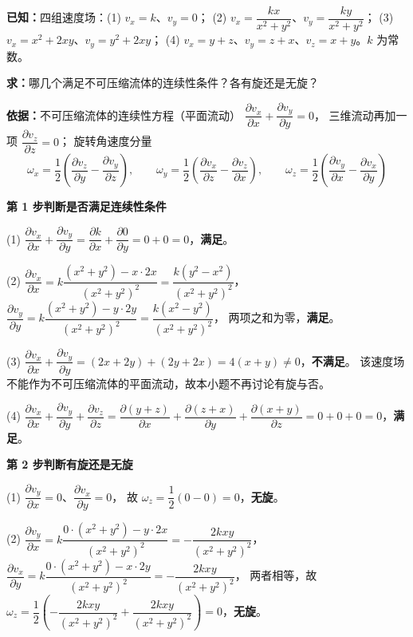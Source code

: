 \begin{jie}
\textbf{已知：}四组速度场：(1) $v_x=k$、$v_y=0$；
(2) $v_x=\dfrac{kx}{x^2+y^2}$、$v_y=\dfrac{ky}{x^2+y^2}$；
(3) $v_x=x^2+2xy$、$v_y=y^2+2xy$；
(4) $v_x=y+z$、$v_y=z+x$、$v_z=x+y$。$k$ 为常数。

\textbf{求：}哪几个满足不可压缩流体的连续性条件？各有旋还是无旋？

\textbf{依据：}不可压缩流体的连续性方程（平面流动）
$\dfrac{\partial v_x}{\partial x}+\dfrac{\partial v_y}{\partial y}=0$，
三维流动再加一项 $\dfrac{\partial v_z}{\partial z}=0$；
旋转角速度分量
\[ \omega_x=\frac{1}{2}\left(\frac{\partial v_z}{\partial y}-\frac{\partial v_y}{\partial z}\right),\qquad
   \omega_y=\frac{1}{2}\left(\frac{\partial v_x}{\partial z}-\frac{\partial v_z}{\partial x}\right),\qquad
   \omega_z=\frac{1}{2}\left(\frac{\partial v_y}{\partial x}-\frac{\partial v_x}{\partial y}\right) \]

\textbf{第 1 步\quad 判断是否满足连续性条件}

(1) $\dfrac{\partial v_x}{\partial x}+\dfrac{\partial v_y}{\partial y}=\dfrac{\partial k}{\partial x}+\dfrac{\partial 0}{\partial y}=0+0=0$，\textbf{满足}。

(2) $\dfrac{\partial v_x}{\partial x}=k\dfrac{(x^2+y^2)-x\cdot 2x}{(x^2+y^2)^2}=\dfrac{k(y^2-x^2)}{(x^2+y^2)^2}$，
$\dfrac{\partial v_y}{\partial y}=k\dfrac{(x^2+y^2)-y\cdot 2y}{(x^2+y^2)^2}=\dfrac{k(x^2-y^2)}{(x^2+y^2)^2}$，
两项之和为零，\textbf{满足}。

(3) $\dfrac{\partial v_x}{\partial x}+\dfrac{\partial v_y}{\partial y}=(2x+2y)+(2y+2x)=4(x+y)\neq0$，\textbf{不满足}。
该速度场不能作为不可压缩流体的平面流动，故本小题不再讨论有旋与否。

(4) $\dfrac{\partial v_x}{\partial x}+\dfrac{\partial v_y}{\partial y}+\dfrac{\partial v_z}{\partial z}
=\dfrac{\partial(y+z)}{\partial x}+\dfrac{\partial(z+x)}{\partial y}+\dfrac{\partial(x+y)}{\partial z}=0+0+0=0$，\textbf{满足}。

\textbf{第 2 步\quad 判断有旋还是无旋}

(1) $\dfrac{\partial v_y}{\partial x}=0$、$\dfrac{\partial v_x}{\partial y}=0$，
故 $\omega_z=\dfrac{1}{2}(0-0)=0$，\textbf{无旋}。

(2) $\dfrac{\partial v_y}{\partial x}=k\dfrac{0\cdot(x^2+y^2)-y\cdot 2x}{(x^2+y^2)^2}=-\dfrac{2kxy}{(x^2+y^2)^2}$，
$\dfrac{\partial v_x}{\partial y}=k\dfrac{0\cdot(x^2+y^2)-x\cdot 2y}{(x^2+y^2)^2}=-\dfrac{2kxy}{(x^2+y^2)^2}$，
两者相等，故 $\omega_z=\dfrac{1}{2}\left(-\dfrac{2kxy}{(x^2+y^2)^2}+\dfrac{2kxy}{(x^2+y^2)^2}\right)=0$，\textbf{无旋}。


\end{jie}
